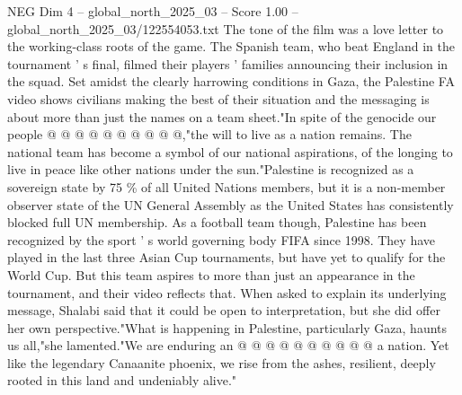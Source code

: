 \begin{textsample}{NEG Dim 4 – global\_north\_2025\_03 – Score 1.00 – global\_north\_2025\_03/122554053.txt}
The tone of the film was a love letter to the working-class roots of the game.
The Spanish team, who beat England in the tournament ' s final, filmed their players ' families announcing their inclusion in the squad.
Set amidst the clearly harrowing conditions in Gaza, the Palestine FA video shows civilians making the best of their situation and the messaging is about more than just the names on a team sheet."In spite of the genocide our people @ @ @ @ @ @ @ @ @ @,"the will to live as a nation remains.
The national team has become a symbol of our national aspirations, of the longing to live in peace like other nations under the sun."Palestine is recognized as a sovereign state by 75 \% of all United Nations members, but it is a non-member observer state of the UN General Assembly as the United States has consistently blocked full UN membership.
As a football team though, Palestine has been recognized by the sport ' s world governing body FIFA since 1998.
They have played in the last three Asian Cup tournaments, but have yet to qualify for the World Cup.
But this team aspires to more than just an appearance in the tournament, and their video reflects that.
When asked to explain its underlying message, Shalabi said that it could be open to interpretation, but she did offer her own perspective."What is happening in Palestine, particularly Gaza, haunts us all,"she lamented."We are enduring an @ @ @ @ @ @ @ @ @ @ a nation.
Yet like the legendary Canaanite phoenix, we rise from the ashes, resilient, deeply rooted in this land and undeniably alive."

\end{textsample}
